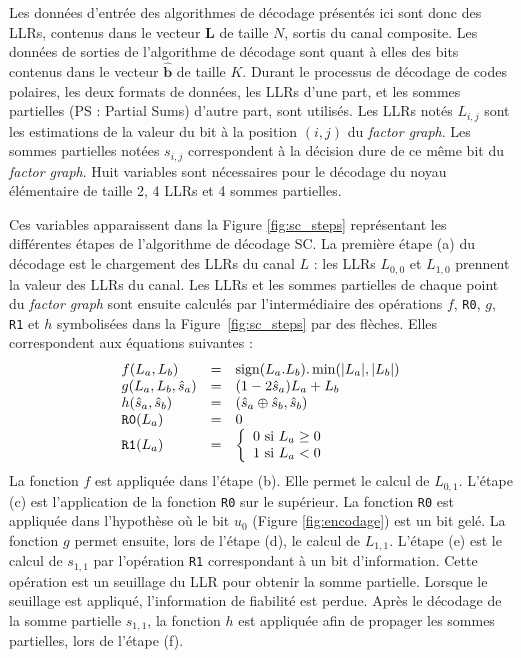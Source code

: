 Les données d'entrée des algorithmes de décodage présentés ici sont donc des LLRs, contenus dans le vecteur $\mathbold{L}$ de taille $N$, sortis du canal composite. Les données de sorties de l'algorithme de décodage sont quant à elles des bits contenus dans le vecteur $\mathbold{\hat{b}}$ de taille $K$.
Durant le processus de décodage de codes polaires, les deux formats de données,  les LLRs d'une part, et les sommes partielles (PS : Partial Sums) d'autre part, sont utilisés. 
Les LLRs notés $L_{i,j}$ sont les estimations de la valeur du bit à la position $(i,j)$ du \textit{factor graph}. Les sommes partielles notées $s_{i,j}$ correspondent à la décision dure de ce même bit du \textit{factor graph}.
Huit variables sont nécessaires pour le décodage du noyau élémentaire de taille 2, 4 LLRs et 4 sommes partielles.

Ces variables apparaissent dans la Figure \ref{fig:sc_steps} représentant les différentes étapes de l'algorithme de décodage SC.
La première étape (a) du décodage est le chargement des LLRs du canal $L$ : les LLRs $L_{0,0}$ et $L_{1,0}$ prennent la valeur des LLRs du canal. Les LLRs et les sommes partielles de chaque point du \textit{factor graph} sont ensuite calculés par l'intermédiaire des opérations $f$, \texttt{R0}, $g$, \texttt{R1} et $h$ symbolisées dans la Figure~\ref{fig:sc_steps} par des flèches. Elles correspondent aux équations suivantes :
\begin{eqnarray}
  \begin{array}{l c l}
    f(L_a,L_b) &=& \text{sign}(L_a.L_b).\min(|L_a|,|L_b|)\\
    g(L_a,L_b,\hat{s}_a)&=&(1-2\hat{s}_a)L_a+L_b\\
    h(\hat{s}_a,\hat{s}_b)&=& (\hat{s}_{a} \oplus \hat{s}_{b}, \hat{s}_{b})\\
    \texttt{R0}(L_a) &=& 0 \\
    \texttt{R1}(L_a) &=&  \left\{\begin{array}{l c l} 0 \text{ si } L_a \geq 0 \\ 1 \text{ si } L_a < 0 \end{array}\right.
  \end{array}
  \label{eq:sc}
\end{eqnarray}
La fonction $f$ est appliquée dans l'étape (b). Elle permet le calcul de $L_{0,1}$.
L'étape (c) est l'application de la fonction \texttt{R0} sur le \noeud supérieur. 
La fonction \texttt{R0} est appliquée dans l'hypothèse où le bit $u_0$ (Figure \ref{fig:encodage}) est un bit gelé.
La fonction $g$ permet ensuite, lors de l'étape (d), le calcul de $L_{1,1}$.
L'étape (e) est le calcul de $s_{1,1}$ par l'opération \texttt{R1} correspondant à un bit d'information. 
Cette opération est un seuillage du LLR pour obtenir la somme partielle.
Lorsque le seuillage est appliqué, l'information de fiabilité est perdue.
Après le décodage de la somme partielle $s_{1,1}$, la fonction $h$ est appliquée afin de propager les sommes partielles, lors de l'étape (f).


